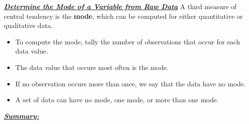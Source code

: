 \documentclass{report}
\begin{document}
         \bigbreak \noindent \bigbreak \noindent 
         \textbf{\textit{\underline{Determine the Mode of a Variable from Raw Data}}}
         \bigbreak \noindent 
         A third measure of central tendency is the \textbf{mode}, which can be computed for either quantitative or qualitative data.
         \begin{itemize}
             \item To compute the mode, tally the number of observations that occur for each data value.
             \item The data value that occurs most often is the mode.
             \item If no observation occurs more than once, we say that the data have no mode.
             \item A set of data can have no mode, one mode, or more than one mode.
         \end{itemize}

         \bigbreak \noindent \bigbreak \noindent 
         \textbf{\textit{\underline{Summary:}}}
         \bigbreak \noindent 
        \begin{figure}[ht]
            \centering
            \label{fig:figure2}
        \end{figure}

        \pagebreak \bigbreak \noindent
\end{document}
